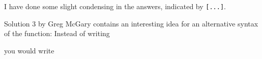 \begin{comment}
Some more solutions to Exercise 15 will follow in a few days.

Michael Downes %
mjd@math.ams.org (Internet) ASCII 32--54,55--126: !"#$%
789:;<=>?@ABCDEFGHIJKLMNOPQRSTUVWXYZ[\]^_`abcdefghijklmnopqrstuvwxyz{|}~

Date: 30 Dec 1993 17:07:17 -0500 (EST)
From: Michael Downes <MJD@MATH.AMS.ORG>
Subject: Around the Bend #15, answers, 3rd installment
To: info-tex@shsu.edu
X-ListName: TeX-Related Network Discussion List <INFO-TeX@SHSU.edu>
\end{comment}

I have done some slight condensing in the answers, indicated by
\verb?[...]?.

Solution 3 by Greg McGary contains an interesting idea for an
alternative syntax of the \cmd{\trimspaces} function: Instead of writing
you would write
\begin{lcode}
  \trimmed{}
\end{lcode}
